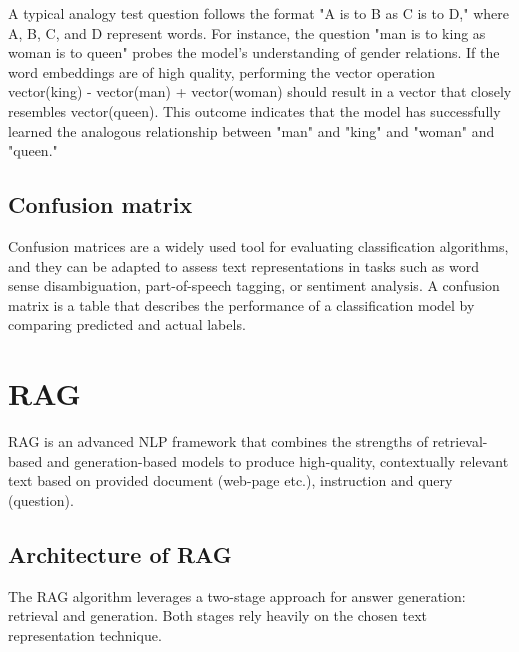 A typical analogy test question follows the format "A is to B as C is to D," where A, B, C, and D represent words.
For instance, the question "man is to king as woman is to queen" probes the model's understanding of gender relations.
If the word embeddings are of high quality, performing the vector operation vector(king) - vector(man) + vector(woman) should result in a vector that closely resembles vector(queen).
This outcome indicates that the model has successfully learned the analogous relationship between "man" and "king" and "woman" and "queen."

\subsection{Confusion matrix}

Confusion matrices are a widely used tool for evaluating classification algorithms, and they can be adapted to assess text representations in tasks such as word sense disambiguation, part-of-speech tagging, or sentiment analysis.
A confusion matrix is a table that describes the performance of a classification model by comparing predicted and actual labels.

\section{\acf{RAG}}
\ac{RAG} \cite{lewis2021retrievalaugmented} \nocite{umarjamilai} is an advanced \ac{NLP} framework that combines the strengths of retrieval-based and generation-based models to produce high-quality, contextually relevant text based on provided document (web-page etc.), instruction and query (question). 

\subsection{Architecture of \ac{RAG}}
The \ac{RAG} algorithm leverages a two-stage approach for answer generation: retrieval and generation.
Both stages rely heavily on the chosen text representation technique.

